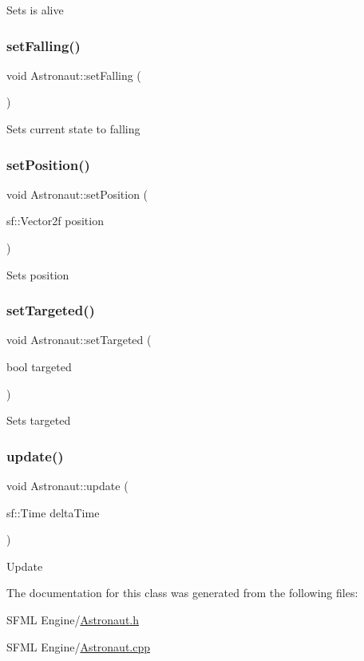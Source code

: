 Sets is alive \mbox{\label{class_astronaut_aca642a5da85bd7546c7750d87ffdad5c}} 
\subsubsection{\texorpdfstring{set\+Falling()}{setFalling()}}
{\footnotesize\ttfamily void Astronaut\+::set\+Falling (\begin{DoxyParamCaption}{ }\end{DoxyParamCaption})}

Sets current state to falling \mbox{\label{class_astronaut_a76e03abf8dd510b493c4e079015725d8}} 
\subsubsection{\texorpdfstring{set\+Position()}{setPosition()}}
{\footnotesize\ttfamily void Astronaut\+::set\+Position (\begin{DoxyParamCaption}\item[{sf\+::\+Vector2f}]{position }\end{DoxyParamCaption})}

Sets position \mbox{\label{class_astronaut_aad3dde72837f3a51c18cfe70ce881f93}} 
\subsubsection{\texorpdfstring{set\+Targeted()}{setTargeted()}}
{\footnotesize\ttfamily void Astronaut\+::set\+Targeted (\begin{DoxyParamCaption}\item[{bool}]{targeted }\end{DoxyParamCaption})}

Sets targeted \mbox{\label{class_astronaut_a2df268d2fa9a1783fda0c772130cddd2}} 
\subsubsection{\texorpdfstring{update()}{update()}}
{\footnotesize\ttfamily void Astronaut\+::update (\begin{DoxyParamCaption}\item[{sf\+::\+Time}]{delta\+Time }\end{DoxyParamCaption})}

Update 

The documentation for this class was generated from the following files\+:\begin{DoxyCompactItemize}
\item 
S\+F\+M\+L Engine/\hyperlink{_astronaut_8h}{Astronaut.\+h}\item 
S\+F\+M\+L Engine/\hyperlink{_astronaut_8cpp}{Astronaut.\+cpp}\end{DoxyCompactItemize}
